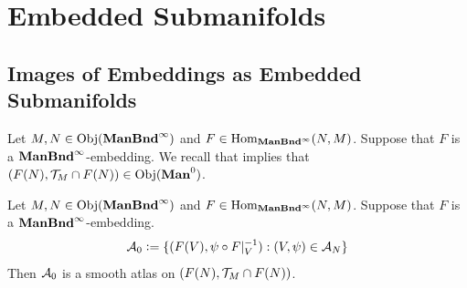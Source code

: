 \documentclass{book}
\begin{document}
	\newpage
	\section{Embedded Submanifolds}
	
	\subsection{Images of Embeddings as Embedded Submanifolds}
	
	\begin{note}
		Let $M, N \in \Obj(\bManBndinf)$ and  $F \in \Hom_{\bManBndinf}(N, M)$. Suppose that $F$ is a  $\bManBndinf$-embedding. We recall that  implies that $(F(N), \MT_M \cap F(N)) \in \Obj(\bManz)$.
	\end{note}
	
	\begin{ex} 
		Let $M, N \in \Obj(\bManBndinf)$ and  $F \in \Hom_{\bManBndinf}(N, M)$. Suppose that $F$ is a  $\bManBndinf$-embedding. 
		$$\MA_0 \defeq \{(F(V), \psi \circ F|_V^{-1}): (V, \psi) \in \MA_N\}$$
		Then $\MA_0$ is a smooth atlas on $(F(N), \MT_M \cap F(N))$.
	\end{ex}
	
\end{document}
